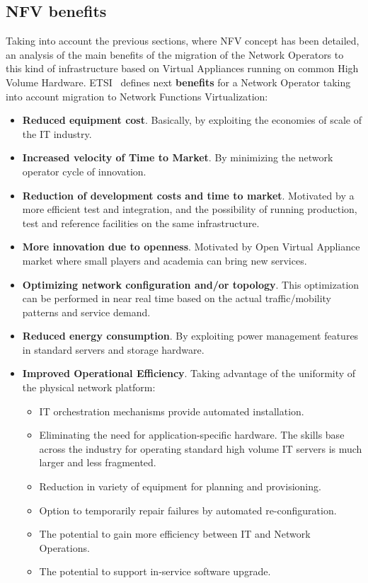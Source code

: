 \documentclass[a4paper, 12pt]{book}
\begin{document}
\subsection{NFV benefits}
\label{subsec:nvfbenefits}

Taking into account the previous sections, where NFV concept has been detailed, an analysis of the main benefits of the migration of the Network Operators to this kind of infrastructure based on Virtual Appliances running on common High Volume Hardware. ETSI~\cite{ETSINFVDefinition} defines next \textbf{benefits} for a Network Operator taking into account migration to Network Functions Virtualization:

\begin{itemize}\itemsep0pt
 \item{\textbf{Reduced equipment cost}}. Basically, by exploiting the economies of scale of the IT industry.
 \item{\textbf{Increased velocity of Time to Market}}. By minimizing the network operator cycle of innovation.
 \item{\textbf{Reduction of development costs and time to market}}. Motivated by a more efficient test and integration, and the possibility of running production, test and reference facilities on the same infrastructure.
 \item{\textbf{More innovation due to openness}}. Motivated by Open Virtual Appliance market where small players and academia can bring new services.
 \item{\textbf{Optimizing network configuration and/or topology}}. This optimization can be performed in near real time based on the actual traffic/mobility patterns and service demand.
 \item{\textbf{Reduced energy consumption}}. By exploiting power management features in standard servers and storage hardware.
 \item{\textbf{Improved Operational Efficiency}}. Taking advantage of the uniformity of the physical network platform:
 \begin{itemize}\itemsep0pt
    \item{IT orchestration mechanisms provide automated installation}.
    \item{Eliminating the need for application-specific hardware}. The skills base across the industry for operating standard high volume IT servers is much larger and less fragmented.
    \item{Reduction in variety of equipment for planning and provisioning}.
    \item{Option to temporarily repair failures by automated re-configuration}.
    \item{The potential to gain more efficiency between IT and Network Operations}.
    \item{The potential to support in-service software upgrade}.
 \end{itemize}
\end{itemize}
\end{document}

